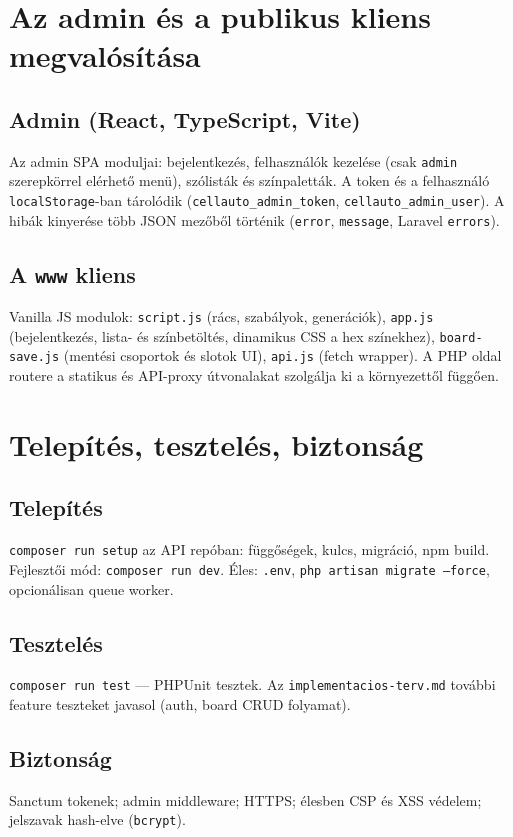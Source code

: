 \chapter{Az admin és a publikus kliens megvalósítása}

\section{Admin (React, TypeScript, Vite)}
Az admin SPA moduljai: bejelentkezés, felhasználók kezelése (csak \texttt{admin} szerepkörrel elérhető menü), szólisták és színpaletták. A token és a felhasználó \texttt{localStorage}-ban tárolódik (\texttt{cellauto\_admin\_token}, \texttt{cellauto\_admin\_user}). A hibák kinyerése több JSON mezőből történik (\texttt{error}, \texttt{message}, Laravel \texttt{errors}).

\section{A \texttt{www} kliens}
Vanilla JS modulok: \texttt{script.js} (rács, szabályok, generációk), \texttt{app.js} (bejelentkezés, lista- és színbetöltés, dinamikus CSS a hex színekhez), \texttt{board-save.js} (mentési csoportok és slotok UI), \texttt{api.js} (fetch wrapper). A PHP oldal routere a statikus és API-proxy útvonalakat szolgálja ki a környezettől függően.

\chapter{Telepítés, tesztelés, biztonság}

\section{Telepítés}
\texttt{composer run setup} az API repóban: függőségek, kulcs, migráció, npm build. Fejlesztői mód: \texttt{composer run dev}. Éles: \texttt{.env}, \texttt{php artisan migrate --force}, opcionálisan queue worker.

\section{Tesztelés}
\texttt{composer run test} — PHPUnit tesztek. Az \texttt{implementacios-terv.md} további feature teszteket javasol (auth, board CRUD folyamat).

\section{Biztonság}
Sanctum tokenek; admin middleware; HTTPS; élesben CSP és XSS védelem; jelszavak hash-elve (\texttt{bcrypt}).

